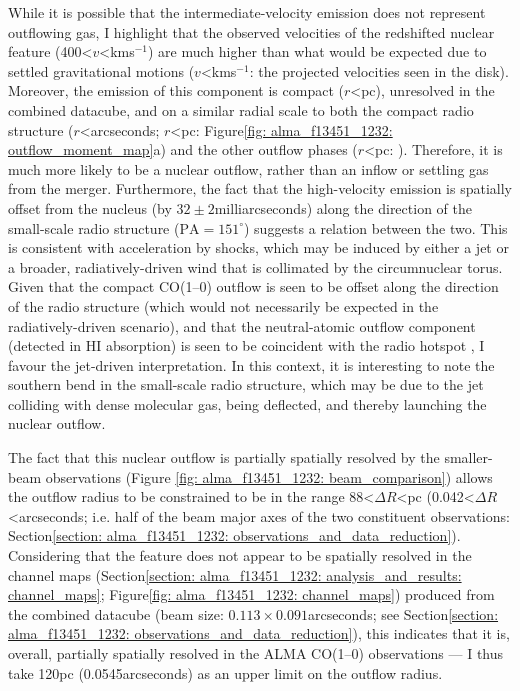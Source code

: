 While it is possible that the intermediate-velocity emission does not represent outflowing gas, I highlight that the observed velocities of the redshifted nuclear feature (400\;\textless\;$v$\;\textless{}\;km\;s$^{-1}$) are much higher than what would be expected due to settled gravitational motions ($v$\;\textless{}\;km\;s$^{-1}$: the projected velocities seen in the disk). Moreover, the emission of this component is compact ($r$\;\textless{}\;pc), unresolved in the combined datacube, and on a similar radial scale to both the compact radio structure ($r$\;\textless{}\;arcseconds; $r$\;\textless{}\;pc: Figure\;\ref{fig: alma_f13451_1232: outflow_moment_map}a) and the other outflow phases ($r$\;\textless{}\;pc: \citealt{Morganti2013_4c1250, Tadhunter2018}). Therefore, it is much more likely to be a nuclear outflow, rather than an inflow or settling gas from the merger. Furthermore, the fact that the high-velocity emission is spatially offset from the nucleus (by $32\pm2$\;milliarcseconds) along the direction of the small-scale radio structure ($\mathrm{PA}=151^\circ$) suggests a relation between the two. This is consistent with acceleration by shocks, which may be induced by either a jet or a broader, radiatively-driven wind that is collimated by the circumnuclear torus. Given that the compact CO(1--0) outflow is seen to be offset along the direction of the radio structure (which would not necessarily be expected in the radiatively-driven scenario), and that the neutral-atomic outflow component (detected in HI absorption) is seen to be coincident with the radio hotspot \citep{Morganti2013_4c1250}, I favour the jet-driven interpretation. In this context, it is interesting to note the southern bend in the small-scale radio structure, which may be due to the jet colliding with dense molecular gas, being deflected, and thereby launching the nuclear outflow.

The fact that this nuclear outflow is partially spatially resolved by the smaller-beam observations (Figure \ref{fig: alma_f13451_1232: beam_comparison}) allows the outflow radius to be constrained to be in the range 88\;\textless\;$\Delta{R}$\;\textless{}\;pc (0.042\;\textless\;$\Delta{R}$\;\textless{}\;arcseconds; i.e. half of the beam major axes of the two constituent observations: Section\;\ref{section: alma_f13451_1232: observations_and_data_reduction}). Considering that the feature does not appear to be spatially resolved in the channel maps (Section\;\ref{section: alma_f13451_1232: analysis_and_results: channel_maps}; Figure\;\ref{fig: alma_f13451_1232: channel_maps}) produced from the combined datacube (beam size: $0.113\times0.091$\;arcseconds; see Section\;\ref{section: alma_f13451_1232: observations_and_data_reduction}), this indicates that it is, overall, partially spatially resolved in the ALMA CO(1--0) observations --- I thus take 120\;pc (0.0545\;arcseconds) as an upper limit on the outflow radius.

